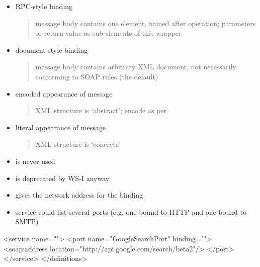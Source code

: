 \documentclass{sepslide-soa-faked} %
\begin{document}
\begin{slide}
\begin{itemize}
\item RPC-style binding
\begin{quote}
message body contains one element, named after operation; parameters or return value as sub-elements of this wrapper
\end{quote}
\item document-style binding
\begin{quote}
message body contains arbitrary XML document, not necessarily conforming to SOAP rules (the default)
\end{quote}
\item encoded appearance of message
\begin{quote}
XML structure is `abstract'; encode as per 
\end{quote}
\item literal appearance of message
\begin{quote}
XML structure is `concrete'
\end{quote}
\item {} is never used
\item {} is deprecated by WS-I anyway
\end{itemize}
\end{slide}

\begin{slide}
\begin{itemize}

	\item gives the network address for the binding
	\item service could list several ports (e.g. one bound to HTTP and one bound to SMTP)
\end{itemize}

\begin{xml}
  <service name="">
    <port name="GoogleSearchPort" binding="">
      <soap:address location="http://api.google.com/search/beta2"/>
    </port>
  </service>
</definitions>
\end{xml}
\end{slide}
\end{document}
